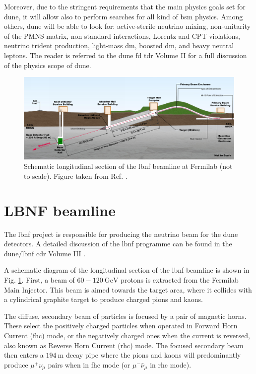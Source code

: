 Moreover, due to the stringent requirements that the main physics goals set for \gls{dune}, it will allow also to perform searches for all kind of \gls{bsm} physics. Among others, \gls{dune} will be able to look for: active-sterile neutrino mixing, non-unitarity of the PMNS matrix, non-standard interactions, Lorentz and CPT violations, neutrino trident production, light-mass \gls{dm}, boosted \gls{dm}, and heavy neutral leptons. The reader is referred to the \gls{dune} \gls{fd} \gls{tdr} Volume II \cite{DUNE2020TDR2} for a full discussion of the physics scope of \gls{dune}.

\begin{figure}[t]
	\centering
	\includegraphics[width=0.95\linewidth]{Images/DUNE/LBNF/beamline-sideview}
	\caption[Schematic longitudinal section of the \gls{lbnf} beamline at Fermilab.]{Schematic longitudinal section of the \gls{lbnf} beamline at Fermilab (not to scale). Figure taken from Ref. \cite{DUNE2016CDR3}.}
	\label{fig:lbnf_beamline}
\end{figure}

\section{LBNF beamline}

The \gls{lbnf} project is responsible for producing the neutrino beam for the \gls{dune} detectors. A detailed discussion of the \gls{lbnf} programme can be found in the \gls{dune}/\gls{lbnf} \gls{cdr} Volume III \cite{DUNE2016CDR3}.

A schematic diagram of the longitudinal section of the \gls{lbnf} beamline is shown in Fig. \ref{fig:lbnf_beamline}. First, a beam of $60-120~\mathrm{GeV}$ protons is extracted from the Fermilab Main Injector. This beam is aimed towards the target area, where it collides with a cylindrical graphite target to produce charged pions and kaons.

The diffuse, secondary beam of particles is focused by a pair of magnetic horns. These select the positively charged particles when operated in Forward Horn Current (\gls{fhc}) mode, or the negatively charged ones when the current is reversed, also known as Reverse Horn Current (\gls{rhc}) mode. The focused secondary beam then enters a $194~\mathrm{m}$ decay pipe where the pions and kaons will predominantly produce $\mu^{+}\nu_{\mu}$ pairs when in \gls{fhc} mode (or $\mu^{-}\bar{\nu}_{\mu}$ in \gls{rhc} mode).

